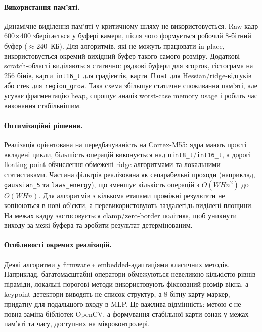 \documentclass[a4paper,12pt]{article}
\begin{document}
\paragraph{Використання пам'яті.}
Динамічне виділення пам'яті у критичному шляху не використовується. Raw-кадр 600$\times$400 зберігається у буфері камери, після чого формується робочий 8-бітний буфер ($\approx$240~КБ). Для алгоритмів, які не можуть працювати in-place, використовується окремий вихідний буфер такого самого розміру. Додаткові scratch-області виділяються статично: рядкові буфери для згорток, гістограма на 256 бінів, карти \texttt{int16\_t} для градієнтів, карти \texttt{float} для Hessian/ridge-відгуків або стек для \texttt{region\_grow}. Така схема збільшує статичне споживання пам'яті, але усуває фрагментацію heap, спрощує аналіз worst-case memory usage і робить час виконання стабільнішим.

\paragraph{Оптимізаційні рішення.}
Реалізація орієнтована на передбачуваність на Cortex-M55: ядра мають прості вкладені цикли, більшість операцій виконується над \texttt{uint8\_t}/\texttt{int16\_t}, а дорогі floating-point обчислення обмежені ridge-алгоритмами та локальними статистиками. Частина фільтрів реалізована як сепарабельні проходи (наприклад, \texttt{gaussian\_5} та \texttt{laws\_energy}), що зменшує кількість операцій з \(O(WHn^2)\) до \(O(WHn)\). Для алгоритмів з кількома етапами проміжні результати не копіюються в нові об'єкти, а перевикористовують заздалегідь виділені площини. На межах кадру застосовується clamp/zero-border політика, щоб уникнути виходу за межі буфера та зробити результат детермінованим.

\paragraph{Особливості окремих реалізацій.}
Деякі алгоритми у firmware є embedded-адаптаціями класичних методів. Наприклад, багатомасштабні оператори обмежуються невеликою кількістю рівнів піраміди, локальні порогові методи використовують фіксований розмір вікна, а keypoint-детектори виводять не список структур, а 8-бітну карту-маркер, придатну для подальшого входу в MLP. Це важлива відмінність: метою є не повна заміна бібліотек OpenCV, а формування стабільної карти ознак у межах пам'яті та часу, доступних на мікроконтролері.
\end{document}
